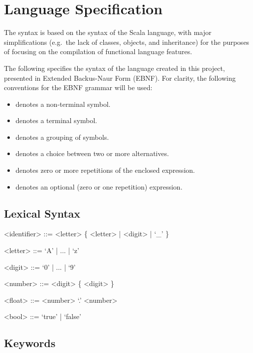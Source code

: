 \chapter{Language Specification}
\label{app:grammar}

The syntax is based on the syntax of the Scala language, with major
simplifications (e.g.\ the lack of classes, objects, and inheritance) for the purposes of focusing
on the compilation of functional language features.

The following specifies the syntax of the language created in this project, presented in Extended
Backus-Naur Form (EBNF). For clarity, the following conventions for the EBNF grammar will be used:
\begin{itemize}
    \singlespacing
    \item {} denotes a non-terminal symbol.
    \item {} denotes a terminal symbol.
    \item {} denotes a grouping of symbols.
    \item {} denotes a choice between two or more alternatives.
    \item {} denotes zero or more repetitions of the enclosed
          expression.
    \item \syntax{[ \synt{...} ]} denotes an optional (zero or one repetition)
          expression.
\end{itemize}

\section{Lexical Syntax}

\begin{grammar}

    <identifier> ::= <letter> \{ <letter> | <digit> | `_' \}

    <letter> ::= `A' | ... | `z'

    <digit> ::= `0' | ... | `9'

    <number> ::= <digit> \{ <digit> \}

    <float> ::= <number> `.' <number>

    <bool> ::= `true' | `false'


\end{grammar}

\section{Keywords}

